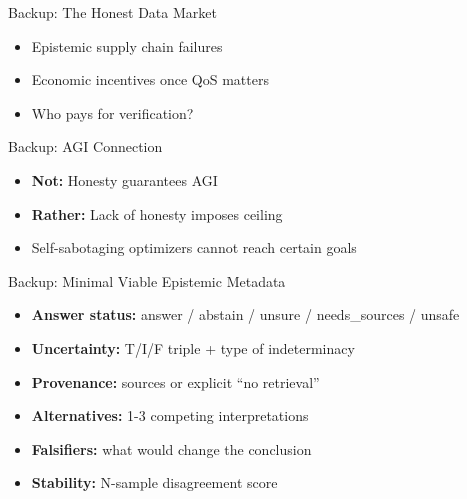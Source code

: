 \documentclass[aspectratio=169,11pt]{beamer}
\begin{document}
\begin{frame}{Backup: The Honest Data Market}
    \begin{itemize}
        \item Epistemic supply chain failures
        \item Economic incentives once QoS matters
        \item Who pays for verification?
    \end{itemize}
\end{frame}

\begin{frame}{Backup: AGI Connection}
    \begin{itemize}
        \item \textbf{Not:} Honesty guarantees AGI
        \item \textbf{Rather:} Lack of honesty imposes ceiling
        \item Self-sabotaging optimizers cannot reach certain goals
    \end{itemize}
\end{frame}

\begin{frame}{Backup: Minimal Viable Epistemic Metadata}
    \small
    \begin{itemize}
        \item \textbf{Answer status:} answer / abstain / unsure / needs\_sources / unsafe
        \item \textbf{Uncertainty:} T/I/F triple + type of indeterminacy
        \item \textbf{Provenance:} sources or explicit ``no retrieval''
        \item \textbf{Alternatives:} 1-3 competing interpretations
        \item \textbf{Falsifiers:} what would change the conclusion
        \item \textbf{Stability:} N-sample disagreement score
    \end{itemize}
\end{frame}
\end{document}
